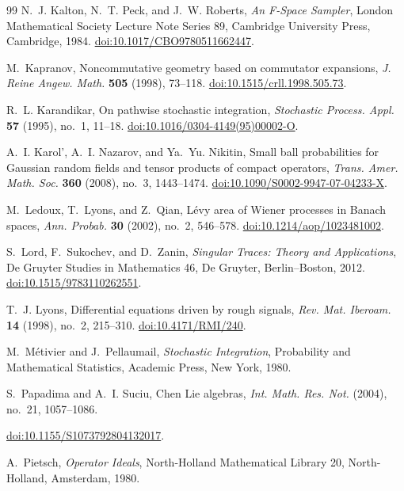 \documentclass[10pt,reqno]{amsart}
\theoremstyle{plain}
\theoremstyle{definition}
\theoremstyle{remark}
\begin{document}
\begin{thebibliography}{99}
N.~J. Kalton, N.~T. Peck, and J.~W. Roberts,
\emph{An F-Space Sampler}, London Mathematical Society Lecture Note
Series 89, Cambridge University Press, Cambridge, 1984.
\href{https://doi.org/10.1017/CBO9780511662447}
{doi:10.1017/CBO9780511662447}.

M.~Kapranov,
Noncommutative geometry based on commutator expansions,
\emph{J. Reine Angew. Math.} \textbf{505} (1998), 73--118.
\href{https://doi.org/10.1515/crll.1998.505.73}
{doi:10.1515/crll.1998.505.73}.

R.~L. Karandikar,
On pathwise stochastic integration,
\emph{Stochastic Process. Appl.} \textbf{57} (1995), no.~1, 11--18.
\href{https://doi.org/10.1016/0304-4149(95)00002-O}
{doi:10.1016/0304-4149(95)00002-O}.

A.~I. Karol', A.~I. Nazarov, and Ya.~Yu. Nikitin,
Small ball probabilities for Gaussian random fields and tensor products of
compact operators,
\emph{Trans. Amer. Math. Soc.} \textbf{360} (2008), no.~3, 1443--1474.
\href{https://doi.org/10.1090/S0002-9947-07-04233-X}
{doi:10.1090/S0002-9947-07-04233-X}.

M.~Ledoux, T.~Lyons, and Z.~Qian,
L\'evy area of Wiener processes in Banach spaces,
\emph{Ann. Probab.} \textbf{30} (2002), no.~2, 546--578.
\href{https://doi.org/10.1214/aop/1023481002}
{doi:10.1214/aop/1023481002}.

S.~Lord, F.~Sukochev, and D.~Zanin,
\emph{Singular Traces: Theory and Applications}, De Gruyter Studies in
Mathematics 46, De Gruyter, Berlin--Boston, 2012.
\href{https://doi.org/10.1515/9783110262551}
{doi:10.1515/9783110262551}.

T.~J. Lyons,
Differential equations driven by rough signals,
\emph{Rev. Mat. Iberoam.} \textbf{14} (1998), no.~2, 215--310.
\href{https://doi.org/10.4171/RMI/240}
{doi:10.4171/RMI/240}.

M.~M\'etivier and J.~Pellaumail,
\emph{Stochastic Integration}, Probability and Mathematical Statistics,
Academic Press, New York, 1980.

S.~Papadima and A.~I. Suciu,
Chen Lie algebras,
\emph{Int. Math. Res. Not.} (2004), no.~21, 1057--1086.
\par\noindent
\href{https://doi.org/10.1155/S1073792804132017}
{doi:10.1155/S1073792804132017}.

A.~Pietsch,
\emph{Operator Ideals}, North-Holland Mathematical Library 20,
North-Holland, Amsterdam, 1980.


\end{thebibliography}
\end{document}
